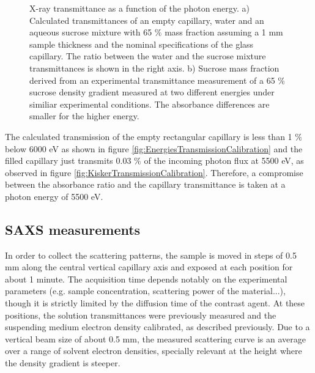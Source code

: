 \begin{figure}%
	\centering
{}
	\caption[X-ray transmittance of the density gradient capillary at different energies.]{X-ray transmittance as a function of the photon energy. a) Calculated transmittances \citep{henke_x-ray_1993} of an empty capillary, water and an aqueous sucrose mixture with 65 $\%$ mass fraction assuming a 1 mm sample thickness and the nominal specifications of the glass capillary. The ratio between the water and the sucrose mixture transmittances is shown in the right axis. b) Sucrose mass fraction derived from an experimental transmittance measurement of a 65 $\%$ sucrose density gradient measured at two different energies under similiar experimental conditions. The absorbance differences are smaller for the higher energy.}

\end{figure}

The calculated transmission of the empty rectangular capillary is less than 1 $\%$ below 6000 eV as shown in figure \ref{fig:EnergiesTransmissionCalibration} and the filled capillary just transmits 0.03 $\%$ of the incoming photon flux at 5500 eV, as observed in figure \ref{fig:KiskerTransmissionCalibration}. Therefore, a compromise between the absorbance ratio and the capillary transmittance is taken at a photon energy of 5500 eV. 

\subsection{SAXS measurements}
\label{sec:DensityGradientSAXS}

In order to collect the scattering patterns, the sample is moved in steps of 0.5 mm along the central vertical capillary axis and exposed at each position for about 1 minute. The acquisition time depends notably on the experimental parameters (e.g. sample concentration, scattering power of the material...), though it is strictly limited by the diffusion time of the contrast agent. At these positions, the solution transmittances were previously measured and the suspending medium electron density calibrated, as described previously. Due to a vertical beam size of about 0.5 mm, the measured scattering curve is an average over a range of solvent electron densities, specially relevant at the height where the density gradient is steeper. 

